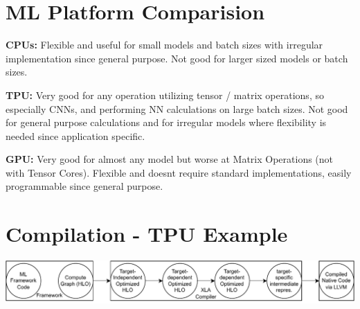 \documentclass{handout}
\begin{document}
\section{ML Platform Comparision}
\textbf{CPUs:}
Flexible and useful for small models and batch sizes with irregular implementation since general purpose. Not good for larger sized models or batch sizes.

\textbf{TPU:}
Very good for any operation utilizing tensor / matrix operations, so especially CNNs, and performing NN calculations on large batch sizes. Not good for general purpose calculations and for irregular models where flexibility is needed since application specific.

\textbf{GPU:}
Very good for almost any model but worse at Matrix Operations (not with Tensor Cores). Flexible and doesnt require standard implementations, easily programmable since general purpose.


\section{Compilation - TPU Example}
\includegraphics[width=1\textwidth]{images/Compile_Path.drawio.pdf}
\end{document}
